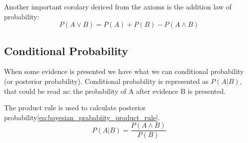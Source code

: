 Another important corolary dericed from the axioms is the addition law of probability:
\begin{equation}
P(A\vee B)=P(A)+P(B) - P(A\wedge B)
\end{equation}

\subsection{Conditional Probability}
\label{subsubsec:conditionalprobability}
When some evidence is presented we have what we can conditional probability (or posterior probability). Conditional probability  is represented as $P(A|B)$, that could be read as: the probability of A after evidence B is presented. 

The product rule is used to calculate posterior probability\ref{eq:bayesian_prababiity_product_rule}.
\begin{equation}
\label{eq:bayesian_prababiity_product_rule}
P(A|B)=\frac{P(A\wedge B)}{P(B)}
\end{equation}


